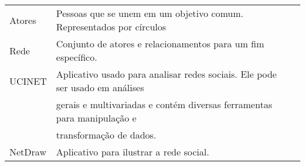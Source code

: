 \label{ap:glossario}


\begin{tabular}[htbp]{|l|l|l}
\cline{1-2}
Atores  & Pessoas que se unem em um objetivo comum. Representados por círculos                                                                                                         &  \\ \cline{1-2}
Rede    & Conjunto de atores e relacionamentos para um fim específico.                                                                                                                 &  \\ \cline{1-2}
UCINET  & Aplicativo usado para analisar redes sociais. Ele pode ser usado em análises \\
        & gerais e multivariadas e contém diversas ferramentas para manipulação e \\
        & transformação de dados. &  \\ \cline{1-2}
NetDraw & Aplicativo para ilustrar a rede social.                                                                                                                                       &  \\ \cline{1-2}
\end{tabular}
